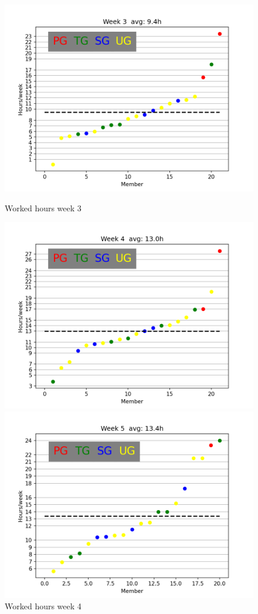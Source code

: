 \documentclass{article}
\begin{document}
        \begin{figure}[!htb]
              \includegraphics[width=\linewidth]{images/week_3.png}
              \caption{Worked hours week 3}\label{fig:week3}
            \endminipage\hfill
              \includegraphics[width=\linewidth]{images/week_4.png}
              \caption{Worked hours week 4}\label{fig:week4}
            \endminipage\hfill
              \includegraphics[width=\linewidth]{images/week_5.png}

\end{figure}
\end{document}
